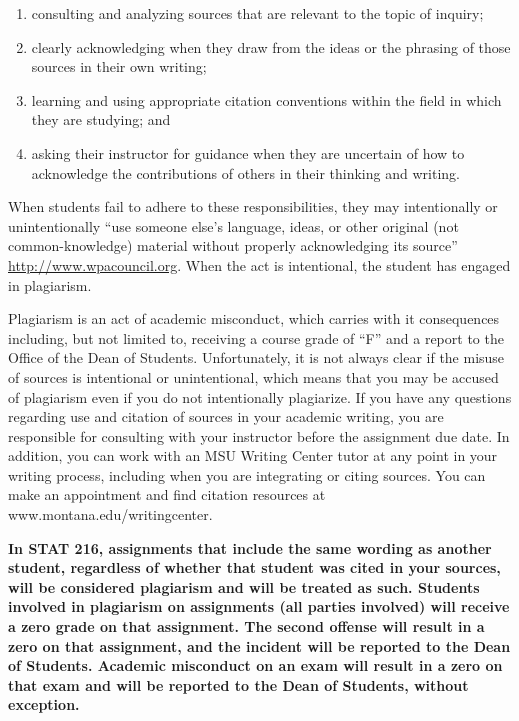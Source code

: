 \documentclass[
]{article}
\providecommand{\tightlist}{%
  \setlength{\itemsep}{0pt}\setlength{\parskip}{0pt}}
\begin{document}
\begin{enumerate}
\def\labelenumi{\arabic{enumi}.}
\tightlist
\item
  consulting and analyzing sources that are relevant to the topic of
  inquiry;
\item
  clearly acknowledging when they draw from the ideas or the phrasing of
  those sources in their own writing;
\item
  learning and using appropriate citation conventions within the field
  in which they are studying; and
\item
  asking their instructor for guidance when they are uncertain of how to
  acknowledge the contributions of others in their thinking and writing.
\end{enumerate}

When students fail to adhere to these responsibilities, they may
intentionally or unintentionally ``use someone else's language, ideas,
or other original (not common-knowledge) material without properly
acknowledging its source'' \url{http://www.wpacouncil.org}. When the act
is intentional, the student has engaged in plagiarism.

Plagiarism is an act of academic misconduct, which carries with it
consequences including, but not limited to, receiving a course grade of
``F'' and a report to the Office of the Dean of Students. Unfortunately,
it is not always clear if the misuse of sources is intentional or
unintentional, which means that you may be accused of plagiarism even if
you do not intentionally plagiarize. If you have any questions regarding
use and citation of sources in your academic writing, you are
responsible for consulting with your instructor before the assignment
due date. In addition, you can work with an MSU Writing Center tutor at
any point in your writing process, including when you are integrating or
citing sources. You can make an appointment and find citation resources
at www.montana.edu/writingcenter.

\textbf{ In STAT 216, assignments that include the same wording as
another student, regardless of whether that student was cited in your
sources, will be considered plagiarism and will be treated as such.
Students involved in plagiarism on assignments (all parties involved)
will receive a zero grade on that assignment. The second offense will
result in a zero on that assignment, and the incident will be reported
to the Dean of Students. Academic misconduct on an exam will result in a
zero on that exam and will be reported to the Dean of Students, without
exception.}
\end{document}

